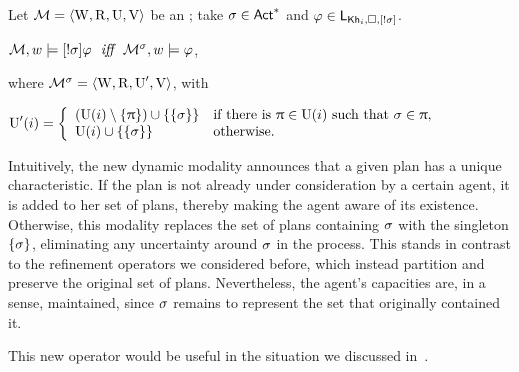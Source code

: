 \begin{definition}\label{def:srefsemantics}
Let $\mathcal{M} = \langle \operatorname{W}, \operatorname{R}, \operatorname{U}, \operatorname{V} \rangle$ be an \ults; take $\sigma \in {\rm \sf Act}^*$ and $\varphi \in \mathsf{L}_{{\sf Kh}_i,\square,[!\sigma]}$.
\begin{spcenter}
$\mathcal{M},w \models [!\sigma]\varphi \ \ \mbox{\it iff} \ \ \mathcal{M}^\sigma,w \models \varphi$,
\end{spcenter}
where $\mathcal{M}^\sigma = \langle \operatorname{W},\operatorname{R},\operatorname{U}',\operatorname{V} \rangle$, with
\begin{center}
  $\operatorname{U}'(i) =
  \left\{
    \begin{array}{ll}
      (\operatorname{U}(i) \setminus \{ \uppi \}) \cup \{ \{ \sigma \} \} & \text{if there is } \uppi \in \operatorname{U}(i) \text{ such that } \sigma \in \uppi, \\
      \operatorname{U}(i) \cup \{ \{ \sigma \} \} & \text{otherwise}.
    \end{array}
  \right.$
\end{center}
\end{definition}

\medskip

Intuitively, the new dynamic modality announces that a given plan has a unique characteristic. If the plan is not already under consideration by a certain agent, it is added to her set of plans, thereby making the agent aware of its existence.
Otherwise, this modality replaces the set of plans containing $\sigma$ with the singleton
$\{\sigma\}$, eliminating any uncertainty around $\sigma$ in the process. This stands in contrast to the refinement operators we considered before, which instead partition and preserve the original set of plans. Nevertheless, the agent’s capacities are, in a sense, maintained, since $\sigma$ remains to represent the set that originally contained it.

\medskip

This new operator would be useful in the situation we discussed in~.

\medskip 

